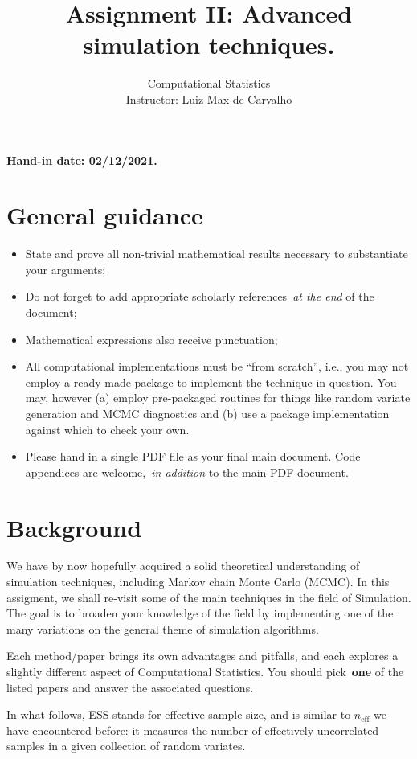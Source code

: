 \documentclass[a4paper,10pt, notitlepage]{report}
\title{Assignment II: Advanced simulation techniques.}
\author{Computational Statistics \\ Instructor: Luiz Max de Carvalho}
\begin{document}
\maketitle

\textbf{Hand-in date: 02/12/2021.}

\section*{General guidance}
\begin{itemize}
 \item State and prove all non-trivial mathematical results necessary to substantiate your arguments;
 \item Do not forget to add appropriate scholarly references~\textit{at the end} of the document;
 \item Mathematical expressions also receive punctuation;
 \item All computational implementations must be ``from scratch'', i.e., you may not employ a ready-made package to implement the technique in question. 
 You may, however (a) employ pre-packaged routines for things like random variate generation and MCMC diagnostics and (b) use a package implementation against which to check your own.
 \item Please hand in a single PDF file as your final main document.
 Code appendices are welcome,~\textit{in addition} to the main PDF document.
 \end{itemize}


\section*{Background}

We have by now hopefully acquired a solid theoretical understanding of simulation techniques, including Markov chain Monte Carlo (MCMC).
In this assigment, we shall re-visit some of the main techniques in the field of Simulation.
The goal is to broaden your knowledge of the field by implementing one of the many variations on the general theme of simulation algorithms.

Each method/paper brings its own advantages and pitfalls, and each explores a slightly different aspect of Computational Statistics.
You should pick~\textbf{one} of the listed papers and answer the associated questions.

In what follows, ESS stands for effective sample size, and is similar to $n_{\text{eff}}$ we have encountered before: it measures the number of effectively uncorrelated samples in a given collection of random variates.
\end{document}
